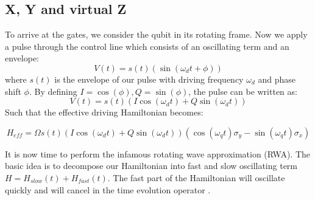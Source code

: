 \subsection{X, Y and virtual Z}\label{sec:how_to_make_gates}
To arrive at the gates, we consider the qubit in its rotating frame. Now we apply a pulse through the control line which consists of an oscillating term and an envelope:
\begin{equation}
    V(t) = s(t) (\sin(\omega_d t + \phi))
\end{equation}
where $s(t)$ is the envelope of our pulse with driving frequency $\omega_d$ and phase shift $\phi$. By defining $I = \cos(\phi), Q = \sin(\phi)$, the pulse can be written as:
\begin{equation}
    V(t) = s(t) \left(I \cos(\omega_d t) + Q \sin(\omega_d t)\right) 
\end{equation}
Such that the effective driving Hamiltonian becomes:
\begin{fullwidth}
\begin{equation}
    H_{eff} = \Omega s(t) \left(I \cos(\omega_d t) + Q \sin(\omega_d t)\right)   \left(\cos(\omega_q t)\sigma_y - \sin(\omega_q t) \sigma_x \right)
\end{equation}
\end{fullwidth}
It is now time to perform the infamous rotating wave approximation (RWA). The basic idea is to decompose our Hamiltonian into fast and slow oscillating term $H = H_{slow}(t) + H_{fast}(t)$. The fast part of the Hamiltonian will oscillate quickly and will cancel in the time evolution operator
. %

